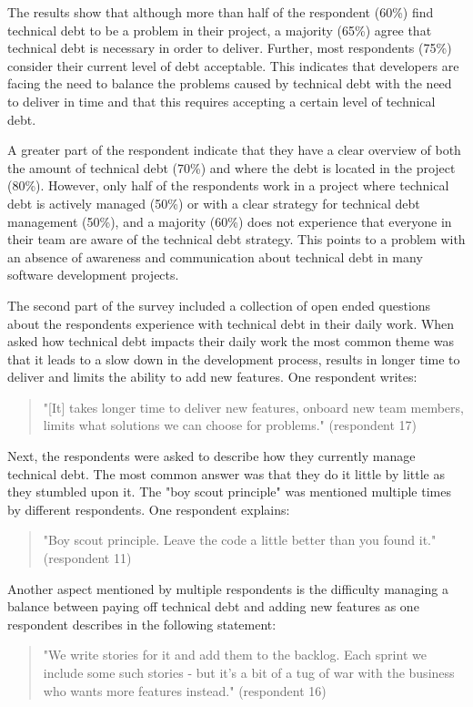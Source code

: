 

The results show that although more than half of the respondent (60\%) find technical debt to be a problem in their project, a majority (65\%) agree that technical debt is necessary in order to deliver.
Further, most respondents (75\%) consider their current level of debt acceptable.
This indicates that developers are facing the need to balance the problems caused by technical debt with the need to deliver in time and that this requires accepting a certain level of technical debt.

A greater part of the respondent indicate that they have a clear overview of both the amount of technical debt (70\%) and where the debt is located in the project (80\%).
However, only half of the respondents work in a project where technical debt is actively managed (50\%) or with a clear strategy for technical debt management (50\%), and a majority (60\%) does not experience that everyone in their team are aware of the technical debt strategy.
This points to a problem with an absence of awareness and communication about technical debt in many software development projects.

The second part of the survey included a collection of open ended questions about the respondents experience with technical debt in their daily work.
When asked how technical debt impacts their daily work the most common theme was that it leads to a slow down in the development process, results in longer time to deliver and limits the ability to add new features.
One respondent writes:
\begin{quote}
  "[It] takes longer time to deliver new features, onboard new team members, limits what solutions we can choose for problems." (respondent 17)
\end{quote}

Next, the respondents were asked to describe how they currently manage technical debt.
The most common answer was that they do it little by little as they stumbled upon it.
The "boy scout principle" was mentioned multiple times by different respondents.
One respondent explains:
\begin{quote}
  "Boy scout principle. Leave the code a little better than you found it." (respondent 11)
\end{quote}
Another aspect mentioned by multiple respondents is the difficulty managing a balance between paying off technical debt and adding new features as one respondent describes in the following statement: 
\begin{quote}
  "We write stories for it and add them to the backlog. Each sprint we include some such stories - but it's a bit of a tug of war with the business who wants more features instead." (respondent 16)
\end{quote}


